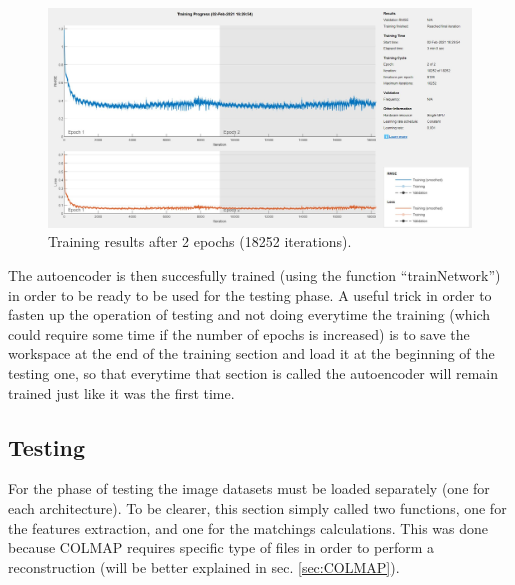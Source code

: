 \begin{figure}[H]
    \centering
    \includegraphics[width=\textwidth]{images/2EPOCHS.jpg}
    \caption{Training results after 2 epochs (18252 iterations).}
    \label{fig:2epochs}    
\end{figure}

The autoencoder is then succesfully trained (using the function ``trainNetwork'') in order to be ready to be used for the testing phase. A useful trick in order to fasten up the operation of testing and not doing everytime the training (which could require some time if the number of epochs is increased) is to save the workspace at the end of the training section and load it at the beginning of the testing one, so that everytime that section is called the autoencoder will remain trained just like it was the first time.

\subsection{Testing}
For the phase of testing the image datasets must be loaded separately (one for each architecture). To be clearer, this section simply called two functions, one for the features extraction, and one for the matchings calculations. This was done because COLMAP requires specific type of files in order to perform a reconstruction (will be better explained in sec. \ref{sec:COLMAP}).

